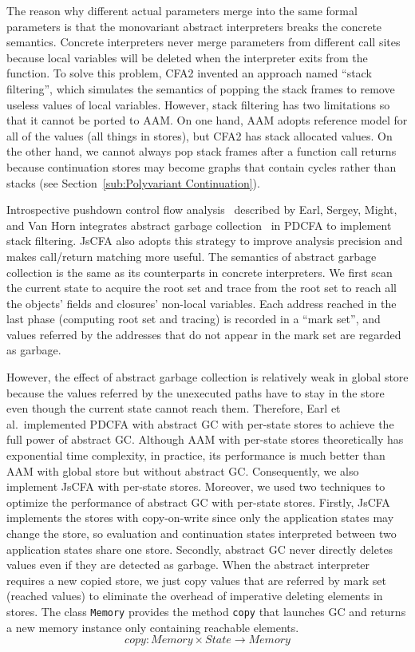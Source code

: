 \documentclass[12pt]{report}
\begin{document}
The reason why different actual parameters merge into the same formal parameters is that the monovariant abstract interpreters breaks the concrete semantics. Concrete interpreters never merge parameters from different call sites because local variables will be deleted when the interpreter exits from the function.
To solve this problem, CFA2 invented an approach named ``stack filtering'', which simulates the semantics of popping the stack frames to remove useless values of local variables.
However, stack filtering has two limitations so that it cannot be ported to AAM\@. On one hand, AAM adopts reference model for all of the values (all things in stores), but CFA2 has stack allocated values.
On the other hand, we cannot always pop stack frames after a function call returns because continuation stores may become graphs that contain cycles rather than stacks (see Section~\ref{sub:Polyvariant Continuation}).

Introspective pushdown control flow analysis~\cite{earl2012introspective} described by Earl, Sergey, Might, and Van Horn integrates abstract garbage collection~\cite{might2006improving} in PDCFA to implement stack filtering.
JsCFA also adopts this strategy to improve analysis precision and makes call/return matching more useful.
The semantics of abstract garbage collection is the same as its counterparts in concrete interpreters.
We first scan the current state to acquire the root set and trace from the root set to reach all the objects' fields and closures' non-local variables. Each address reached in the last phase (computing root set and tracing) is recorded in a ``mark set'', and values referred by the addresses that do not appear in the mark set are regarded as garbage.

However, the effect of abstract garbage collection is relatively weak in global store because the values referred by the unexecuted paths have to stay in the store even though the current state cannot reach them.
Therefore, Earl et al.\ implemented PDCFA with abstract GC with per-state stores to achieve the full power of abstract GC\@.
Although AAM with per-state stores theoretically has exponential time complexity, in practice, its performance is much better than AAM with global store but without abstract GC\@.
Consequently, we also implement JsCFA with per-state stores. Moreover, we used two techniques to optimize the performance of abstract GC with per-state stores.
Firstly, JsCFA implements the stores with copy-on-write since only the application states may change the store, so evaluation and continuation states interpreted between two application states share one store.
Secondly, abstract GC never directly deletes values even if they are detected as garbage. When the abstract interpreter requires a new copied store, we just copy values that are referred by mark set (reached values) to eliminate the overhead of imperative deleting elements in stores.
The class \verb|Memory| provides the method \verb|copy| that launches GC and returns a new memory instance only containing reachable elements.
\[
copy: Memory \times State \to Memory
\]
\end{document}
